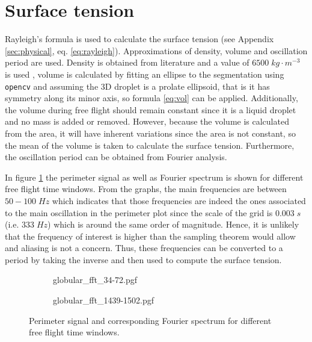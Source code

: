 \section{Surface tension}

Rayleigh's formula \cite{rayleigh} is used to calculate the surface tension (see Appendix \ref{sec:physical}, eq. \eqref{eq:rayleigh}). Approximations of density, volume and oscillation period are used. Density is obtained from literature and a value of $6500\;kg\cdot m^{-3}$ is used \cite{surface_tension}, volume is calculated by fitting an ellipse to the segmentation using \texttt{opencv} and assuming the 3D droplet is a prolate ellipsoid, that is it has symmetry along its minor axis, so formula \eqref{eq:vol} can be applied. Additionally, the volume during free flight should remain constant since it is a liquid droplet and no mass is added or removed. However, because the volume is calculated from the area, it will have inherent variations since the area is not constant, so the mean of the volume is taken to calculate the surface tension. Furthermore, the oscillation period can be obtained from Fourier analysis. 

In figure \ref{fig:fft} the perimeter signal as well as Fourier spectrum is shown for different free flight time windows. From the graphs, the main frequencies are between $50-100\;Hz$ which indicates that those frequencies are indeed the ones associated to the main oscillation in the perimeter plot since the scale of the grid is $0.003\;s$ (i.e. $333\;Hz$) which is around the same order of magnitude. Hence, it is unlikely that the frequency of interest is higher than the sampling theorem would allow and aliasing is not a concern. Thus, these frequencies can be converted to a period by taking the inverse and then used to compute the surface tension.

\begin{figure}
\centering
  \begin{subfigure}[b]{\textwidth}
    {globular_fft_34-72.pgf}
  \end{subfigure}
\vfill
  \begin{subfigure}[b]{\textwidth}
    {globular_fft_1439-1502.pgf}
  \end{subfigure}
\caption[Perimeter signal and corresponding Fourier spectrum for different free flight time windows]{Perimeter signal and corresponding Fourier spectrum for different free flight time windows.} 
\label{fig:fft}
\end{figure}

